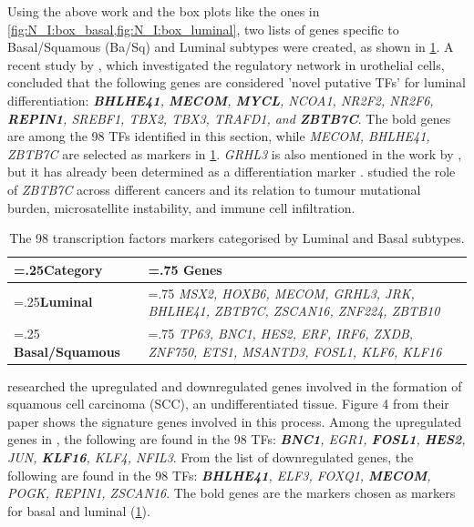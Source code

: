 Using the above work and the box plots like the ones in \cref{fig:N_I:box_basal,fig:N_I:box_luminal}, two lists of genes specific to Basal/Squamous (Ba/Sq) and Luminal subtypes were created, as shown in \cref{tab:N_I:genes_lum_basal}. A recent study by \citet{Ramal2024-ha}, which investigated the regulatory network in urothelial cells, concluded that the following genes are considered 'novel putative TFs' for luminal differentiation: \textit{\textbf{BHLHE41}, \textbf{MECOM}, \textbf{MYCL}, NCOA1, NR2F2, NR2F6, \textbf{REPIN1}, SREBF1, TBX2, TBX3, TRAFD1, and \textbf{ZBTB7C}}. The bold genes are among the 98 TFs identified in this section, while \textit{MECOM, BHLHE41, ZBTB7C} are selected as markers in \cref{tab:N_I:genes_lum_basal}. \textit{GRHL3} is also mentioned in the work by \citet{Ramal2024-ha}, but it has already been determined as a differentiation marker \citet{Bock2014-zy}. \citet{Chen2021-tc} studied the role of \textit{ZBTB7C} across different cancers and its relation to tumour mutational burden, microsatellite instability, and immune cell infiltration.

\begin{table}[!htb]
  \centering
  \scriptsize
  \begin{tabularx}{\textwidth}{>{\hsize=.25\hsize}X|>{\hsize=.75\hsize}X}
    \toprule
    \textbf{Category} & \textbf{Genes} \\
    \midrule
    \textbf{Luminal} & \textit{MSX2, HOXB6, MECOM, GRHL3, JRK, BHLHE41, ZBTB7C, ZSCAN16, ZNF224, ZBTB10} \\
    \midrule
    \textbf{Basal/Squamous} & \textit{TP63, BNC1, HES2, ERF, IRF6, ZXDB, ZNF750, ETS1, MSANTD3, FOSL1, KLF6, KLF16} \\
    \bottomrule
  \end{tabularx}
  \caption{The 98 transcription factors markers categorised by Luminal and Basal subtypes.} %
  \label{tab:N_I:genes_lum_basal}
\end{table}

\citet{Hurst2022-sp} researched the upregulated and downregulated genes involved in the formation of squamous cell carcinoma (SCC), an undifferentiated tissue. Figure 4 from their paper shows the signature genes involved in this process. Among the upregulated genes in \citet{Hurst2022-sp}, the following are found in the 98 TFs: \textit{\textbf{BNC1}, EGR1, \textbf{FOSL1}, \textbf{HES2}, JUN, \textbf{KLF16}, KLF4, NFIL3}. From the list of downregulated genes, the following are found in the 98 TFs: \textit{\textbf{BHLHE41}, ELF3, FOXQ1, \textbf{MECOM}, POGK, REPIN1, ZSCAN16}. The bold genes are the markers chosen as markers for basal and luminal (\cref{tab:N_I:genes_lum_basal}).


